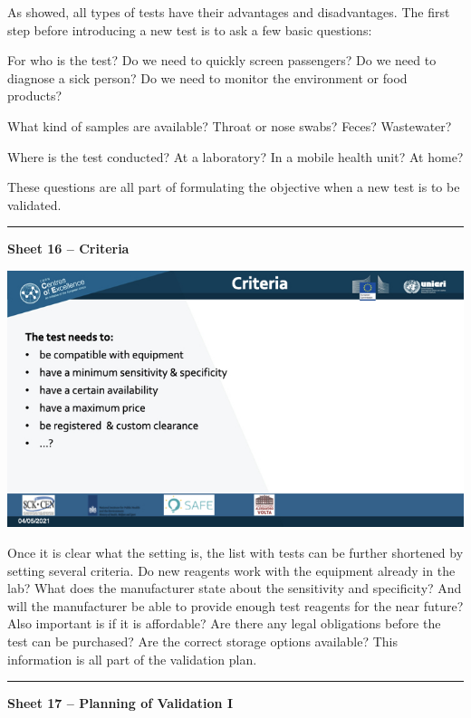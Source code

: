 \documentclass[
]{book}
\begin{document}
As showed, all types of tests have their advantages and disadvantages.
The first step before introducing a new test is to ask a few basic
questions:

For who is the test? Do we need to quickly screen passengers? Do we need
to diagnose a sick person? Do we need to monitor the environment or food
products?

What kind of samples are available? Throat or nose swabs? Feces?
Wastewater?

Where is the test conducted? At a laboratory? In a mobile health unit?
At home?

These questions are all part of formulating the objective when a new
test is to be validated.

\begin{center}\rule{0.5\linewidth}{0.5pt}\end{center}

\textbf{Sheet 16 -- Criteria}

\includegraphics{images/m02/m02_types_of_rapid_tests_final.016.jpeg}

Once it is clear what the setting is, the list with tests can be further
shortened by setting several criteria. Do new reagents work with the
equipment already in the lab? What does the manufacturer state about the
sensitivity and specificity? And will the manufacturer be able to
provide enough test reagents for the near future? Also important is if
it is affordable? Are there any legal obligations before the test can be
purchased? Are the correct storage options available? This information
is all part of the validation plan.

\begin{center}\rule{0.5\linewidth}{0.5pt}\end{center}

\textbf{Sheet 17 -- Planning of Validation I}
\end{document}
